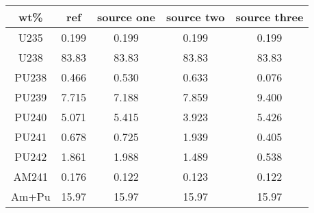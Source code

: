 	\begin{tabular}{ccccc}
		\hline
		\textbf{wt\%} & \textbf{ref} & \textbf{source one} & \textbf{source two} & \textbf{source three} \\ 
		\hline
		U235 & 0.199 & 0.199 & 0.199 & 0.199 \\ 
		U238 & 83.83 & 83.83 & 83.83 & 83.83 \\ 
		PU238 & 0.466 & 0.530 & 0.633 & 0.076 \\ 
		PU239 & 7.715 & 7.188 & 7.859 & 9.400 \\ 
		PU240 & 5.071 & 5.415 & 3.923 & 5.426 \\ 
		PU241 & 0.678 & 0.725 & 1.939 & 0.405 \\ 
		PU242 & 1.861 & 1.988 & 1.489 & 0.538 \\ 
		AM241 & 0.176 & 0.122 & 0.123 & 0.122 \\ 
		Am+Pu & 15.97 & 15.97 & 15.97 & 15.97 \\ 
		\hline 
	\end{tabular} 
